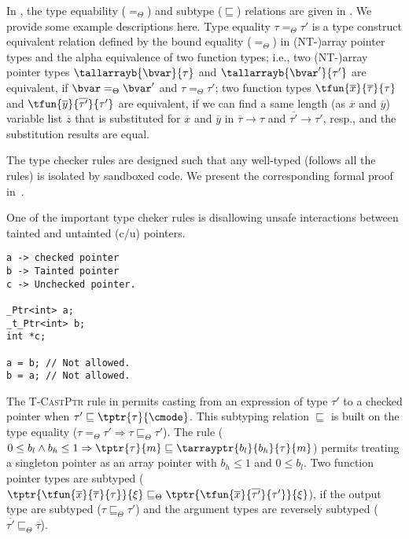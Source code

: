 In \lang, the type equability ($=_{\Theta}$) and subtype ($\sqsubseteq$) relations are given in .
We provide some example descriptions here.
Type equality $\tau=_{\Theta}\tau'$
is a type construct equivalent relation defined by the bound equality ($=_{\Theta}$) in (NT-)array pointer types
and the alpha equivalence of two function types;
i.e., two (NT-)array pointer types $\tallarrayb{\bvar}{\tau} $ and $ \tallarrayb{\bvar'}{\tau'}$ are equivalent, if 
$\bvar =_{\Theta} \bvar'$ and $\tau=_{\Theta}\tau'$; two function types 
$\tfun{\overline{x}}{\overline{\tau}}{\tau} $ and $ \tfun{\overline{y}}{\overline{\tau'}}{\tau'}$
are equivalent, if we can find a same length (as $\overline{x}$ and $\overline{y}$) variable list $\overline{z}$ that is substituted for $\overline{x}$ and $\overline{y}$ in $\overline{\tau} \to {\tau}$ and $\overline{\tau'} \to {\tau'}$, resp.,
and the substitution results are equal.


The type checker rules are designed such that any well-typed (\ie follows all the rules) is isolated by sandboxed code. We present the corresponding formal proof in~\apdx{}.

One of the important type cheker rules is disallowing unsafe interactions between tainted and untainted (c/u) pointers.


\begin{verbatim}
a -> checked pointer
b -> Tainted pointer
c -> Unchecked pointer.

_Ptr<int> a;
_t_Ptr<int> b;
int *c;

a = b; // Not allowed.
b = a; // Not allowed.
\end{verbatim}


The \textsc{T-CastPtr} rule in 
permits casting from an expression of type $\tau'$ to a checked pointer when
$\tau' \sqsubseteq \tptr{\tau}{\cmode}$. This subtyping relation
$\sqsubseteq$ is built on the type equality ($\tau =_{\Theta} \tau'\Rightarrow\tau \sqsubseteq_{\Theta} \tau'$). 
The rule  ($0\le b_l \wedge b_h \le 1 \Rightarrow \tptr{\tau}{m}\sqsubseteq
\tarrayptr{b_l}{b_h}{\tau}{m}$) permits treating a singleton
pointer as an array pointer with $b_h\le 1$ and $0 \le b_l$.
Two function pointer types are subtyped ($\tptr{\tfun{\overline{x}}{\overline{\tau}}{\tau}}{\xi} \sqsubseteq_{\Theta} \tptr{\tfun{\overline{x}}{\overline{\tau'}}{\tau'}}{\xi}$), 
if the output type are subtyped ($\tau\sqsubseteq_{\Theta}\tau'$) and the argument types are reversely subtyped ($\overline{\tau'}\sqsubseteq_{\Theta}\overline{\tau}$).

